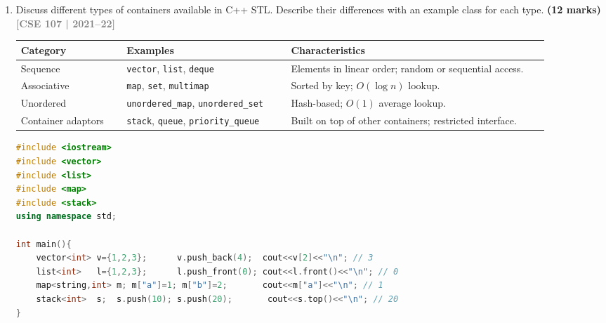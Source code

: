 \documentclass[12pt,a3paper]{article}
\newcommand{\yr}[1]{\hfill\textcolor{gray}{\small\textbf{[#1]}}}
\newcommand{\mk}[1]{\textcolor{orange!70!black}{\small\textbf{(#1 marks)}}}
\begin{document}
\begin{enumerate}
\begin{tcolorbox}
\begin{lstlisting}[language=C++]
template<class T>
void myfunc(T a, T b, char op){
    if      (op == '+') cout << a + b << "\n";
    else if (op == '-') cout << a - b << "\n";
    else if (op == '*') cout << a * b << "\n";
    else                cout << "Invalid Input\n";
}

int main(){
    myfunc(10.5, 4.3, '+');  // 14.8
    myfunc(4,    8,   '*');  // 32
    myfunc(3,    6,   'a');  // Invalid Input
    return 0;
}
\end{lstlisting}

\end{tcolorbox}


\item Discuss different types of containers available in C++ STL. Describe their differences with an example class for each type. \mk{12}
\yr{CSE 107 | 2021--22}
\begin{tcolorbox}[enhanced,breakable,ansbox,colback=cH!4,colframe=cH,
  boxrule=0.8pt,arc=5pt,
  title={\textbf{Answer --- STL container types}},
  fonttitle=\bfseries\color{white},colbacktitle=cH]

\begin{center}
\small
\begin{tabular}{@{}p{0.18\linewidth}p{0.28\linewidth}p{0.44\linewidth}@{}}
\toprule
\textbf{Category} & \textbf{Examples} & \textbf{Characteristics} \\
\midrule
Sequence & \texttt{vector}, \texttt{list}, \texttt{deque} &
  Elements in linear order; random or sequential access. \\[3pt]
Associative & \texttt{map}, \texttt{set}, \texttt{multimap} &
  Sorted by key; $O(\log n)$ lookup. \\[3pt]
Unordered & \texttt{unordered\_map}, \texttt{unordered\_set} &
  Hash-based; $O(1)$ average lookup. \\[3pt]
Container adaptors & \texttt{stack}, \texttt{queue}, \texttt{priority\_queue} &
  Built on top of other containers; restricted interface. \\
\bottomrule
\end{tabular}
\end{center}

\begin{lstlisting}[language=C++]
#include <iostream>
#include <vector>
#include <list>
#include <map>
#include <stack>
using namespace std;

int main(){
    vector<int> v={1,2,3};      v.push_back(4);  cout<<v[2]<<"\n"; // 3
    list<int>   l={1,2,3};      l.push_front(0); cout<<l.front()<<"\n"; // 0
    map<string,int> m; m["a"]=1; m["b"]=2;       cout<<m["a"]<<"\n"; // 1
    stack<int>  s;  s.push(10); s.push(20);       cout<<s.top()<<"\n"; // 20
}
\end{lstlisting}


\end{tcolorbox}
\end{enumerate}
\end{document}
